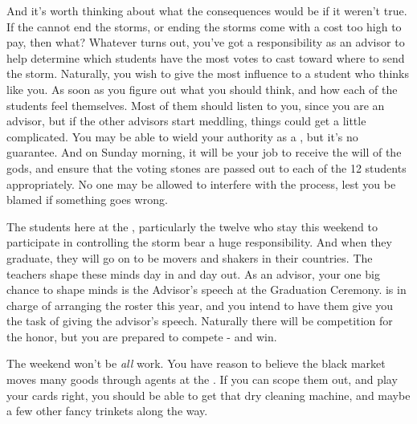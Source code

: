\documentclass[char]{GL2020}
\begin{document}
And it’s worth thinking about what the consequences would be if it weren’t true. If the \pTech{} cannot end the storms, or ending the storms come with a cost too high to pay, then what? Whatever turns out, you’ve got a responsibility as an advisor to help determine which students have the most votes to cast toward where to send the storm. Naturally, you wish to give the most influence to a student who thinks like you. As soon as you figure out what you should think, and how each of the students feel themselves. Most of them should listen to you, since you are an advisor, but if the other advisors start meddling, things could get a little complicated. You may be able to wield your authority as a \cHedonist{\cleric}, but it’s no guarantee. And on Sunday morning, it will be your job to receive the will of the gods, and ensure that the voting stones are passed out to each of the 12 students appropriately. No one may be allowed to interfere with the process, lest you be blamed if something goes wrong.

The students here at the \pSc{}, particularly the twelve who stay this weekend to participate in controlling the storm bear a huge responsibility. And when they graduate, they will go on to be movers and shakers in their countries. The teachers shape these minds day in and day out. As an advisor, your one big chance to shape minds is the Advisor’s speech at the Graduation Ceremony. \cMusic{} is in charge of arranging the roster this year, and you intend to have them give you the task of giving the advisor’s speech. Naturally there will be competition for the honor, but you are prepared to compete - and win.

The weekend won’t be \emph{all} work. You have reason to believe the black market moves many goods through agents at the \pSc{}. If you can scope them out, and play your cards right, you should be able to get that dry cleaning machine, and maybe a few other fancy trinkets along the way.
\end{document}
